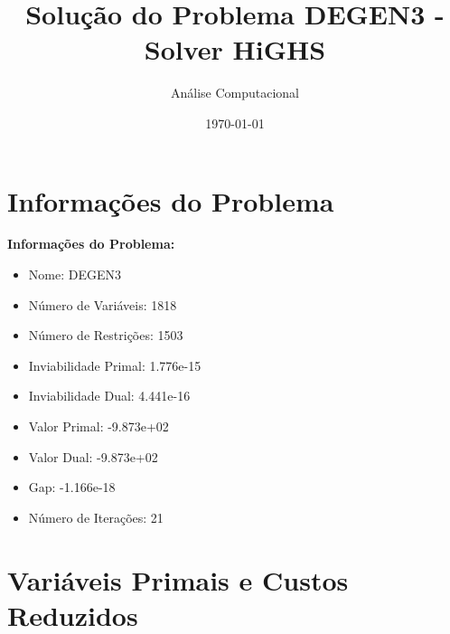 \documentclass[12pt]{article}
\title{Solução do Problema DEGEN3 - Solver HiGHS}
\author{Análise Computacional}
\date{\today}
\begin{document}
\maketitle

\section{Informações do Problema}

\textbf{Informações do Problema:}
\begin{itemize}
\item Nome: DEGEN3
\item Número de Variáveis: 1818
\item Número de Restrições: 1503
\item Inviabilidade Primal: 1.776e-15
\item Inviabilidade Dual: 4.441e-16
\item Valor Primal: -9.873e+02
\item Valor Dual: -9.873e+02
\item Gap: -1.166e-18
\item Número de Iterações: 21
\end{itemize}


\section{Variáveis Primais e Custos Reduzidos}
\end{document}
